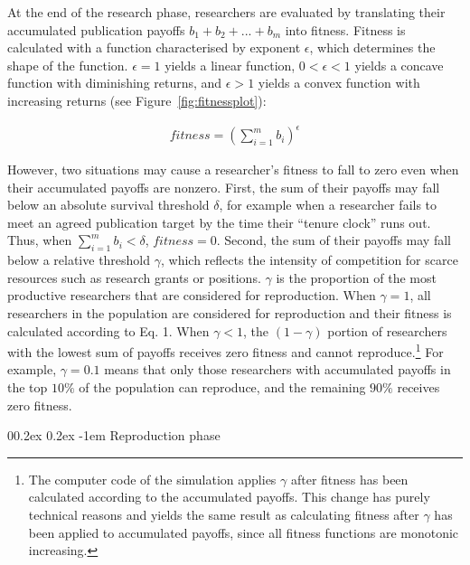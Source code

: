 \documentclass[british,,doc,mask,floatsintext]{apa6}
\makeatletter
\renewcommand{\paragraph}{\@startsection{paragraph}{4}{\parindent}%
  {0\baselineskip \@plus 0.2ex \@minus 0.2ex}%
  {-1em}%
  {\normalfont\normalsize\bfseries\itshape\typesectitle}}
\makeatother
\begin{document}
At the end of the research phase, researchers are evaluated by translating their accumulated publication payoffs \(b_1 + b_2 + ... + b_m\) into fitness.
Fitness is calculated with a function characterised by exponent \(\epsilon\), which determines the shape of the function. \(\epsilon = 1\) yields a linear function, \(0 < \epsilon < 1\) yields a concave function with diminishing returns, and \(\epsilon > 1\) yields a convex function with increasing returns (see Figure~\ref{fig:fitnessplot}):

\begin{align}
fitness = (\sum_{i=1}^{m} b_i)^\epsilon
\end{align}

However, two situations may cause a researcher's fitness to fall to zero even when their accumulated payoffs are nonzero.
First, the sum of their payoffs may fall below an absolute survival threshold \(\delta\), for example when a researcher fails to meet an agreed publication target by the time their \enquote{tenure clock} runs out.
Thus, when \(\sum_{i=1}^{m} b_i < \delta\), \(fitness = 0\).
Second, the sum of their payoffs may fall below a relative threshold \(\gamma\), which reflects the intensity of competition for scarce resources such as research grants or positions.
\(\gamma\) is the proportion of the most productive researchers that are considered for reproduction.
When \(\gamma = 1\), all researchers in the population are considered for reproduction and their fitness is calculated according to Eq. 1.
When \(\gamma < 1\), the \((1 - \gamma)\) portion of researchers with the lowest sum of payoffs receives zero fitness and cannot reproduce.\footnote{The computer code of the simulation applies \(\gamma\) after fitness has been calculated according to the accumulated payoffs. This change has purely technical reasons and yields the same result as calculating fitness after \(\gamma\) has been applied to accumulated payoffs, since all fitness functions are monotonic increasing.}
For example, \(\gamma = 0.1\) means that only those researchers with accumulated payoffs in the top \(10\%\) of the population can reproduce, and the remaining \(90\%\) receives zero fitness.

\hypertarget{reproduction-phase}{%
\paragraph{Reproduction phase}\label{reproduction-phase}}
\end{document}
